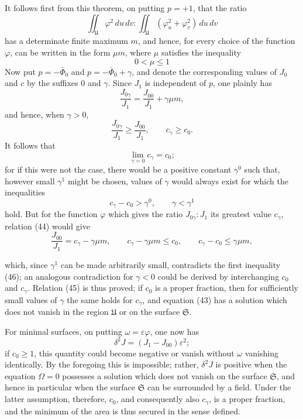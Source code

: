\documentclass[11pt,a4paper,leqno]{article}
\begin{document}
It follows first from this theorem, on putting $p=+1$, that the ratio
\[
\iint_{\mathfrak{U}}\varphi^2\,du\,dv:
\iint_{\mathfrak{U}}(\varphi_u^2+\varphi_v^2)\,du\,dv
\]
has a determinate finite maximum $m$, and hence, for every choice of the
function $\varphi$, can be written in the form $\mu m$, where $\mu$ satisfies
the inequality
\[
0<\mu\leq 1
\]
Now put $p=-\bar\Phi_0$ and $p=-\bar\Phi_0+\gamma$, and denote the
corresponding values of $J_0$ and $c$ by the suffixes 0 and $\gamma$.
Since $J_1$ is independent of $p$, one plainly has
\begin{equation}\tag{44}
\frac{J_{0\gamma}}{J_1}=\frac{J_{00}}{J_1}+\gamma\mu m,
\end{equation}
and hence, when $\gamma>0$,
\[
\frac{J_{0\gamma}}{J_1}\geq\frac{J_{00}}{J_1},\qquad
c_\gamma\geq c_0.
\]
It follows that
\begin{equation}\tag{45}
\lim_{\gamma=0}c_\gamma=c_0;
\end{equation}
for if this were not the case, there would be a positive constant
$\gamma^0$ such that, however small $\gamma^1$ might be chosen, values of
$\gamma$ would always exist for which the inequalities
\begin{equation}\tag{46}
c_\gamma-c_0>\gamma^0,\qquad \gamma<\gamma^1
\end{equation}
hold. But for the function $\varphi$ which gives the ratio
$J_{0\gamma}:J_1$ its greatest value $c_\gamma$, relation (44) would give
\[
\frac{J_{00}}{J_1}=c_\gamma-\gamma\mu m,\qquad
c_\gamma-\gamma\mu m\leq c_0,\qquad
c_\gamma-c_0\leq\gamma\mu m,
\]

which, since $\gamma^1$ can be made arbitrarily small, contradicts the first
inequality (46); an analogous contradiction for $\gamma<0$ could be derived
by interchanging $c_0$ and $c_\gamma$. Relation (45) is thus proved; if
$c_0$ is a proper fraction, then for sufficiently small values of $\gamma$
the same holds for $c_\gamma$, and equation (43) has a solution which does
not vanish in the region $\mathfrak{U}$ or on the surface $\mathfrak{S}$.

For minimal surfaces, on putting $\omega=\varepsilon\varphi$, one now has
\[
\delta^2J=(J_1-J_{00})\varepsilon^2;
\]
if $c_0\geq 1$, this quantity could become negative or vanish without
$\omega$ vanishing identically. By the foregoing this is impossible;
rather, $\delta^2J$ is positive when the equation $\Omega=0$ possesses a
solution which does not vanish on the surface $\mathfrak{S}$, and hence in
particular when the surface $\mathfrak{S}$ can be surrounded by a field.
Under the latter assumption, therefore, $c_0$, and consequently also
$c_\gamma$, is a proper fraction, and the minimum of the area is thus secured
in the sense defined.
\end{document}
